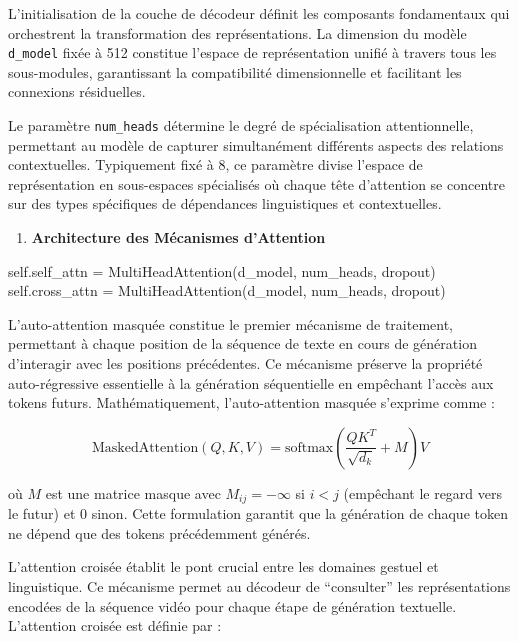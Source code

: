 \documentclass[12pt]{article}
\providecommand{\tightlist}{%
      \setlength{\itemsep}{0pt}\setlength{\parskip}{0pt}}
\newenvironment{Shaded}{}{}
\newcommand{\NormalTok}[1]{{#1}}
\newcommand{\VariableTok}[1]{\textcolor[rgb]{0.10,0.09,0.49}{{#1}}}
\newcommand{\OperatorTok}[1]{\textcolor[rgb]{0.40,0.40,0.40}{{#1}}}
\begin{document}
L'initialisation de la couche de décodeur définit les composants
fondamentaux qui orchestrent la transformation des représentations. La
dimension du modèle \texttt{d\_model} fixée à 512 constitue l'espace de
représentation unifié à travers tous les sous-modules, garantissant la
compatibilité dimensionnelle et facilitant les connexions résiduelles.

Le paramètre \texttt{num\_heads} détermine le degré de spécialisation
attentionnelle, permettant au modèle de capturer simultanément
différents aspects des relations contextuelles. Typiquement fixé à 8, ce
paramètre divise l'espace de représentation en sous-espaces spécialisés
où chaque tête d'attention se concentre sur des types spécifiques de
dépendances linguistiques et contextuelles.

\begin{enumerate}
\def\labelenumi{\arabic{enumi}.}
\setcounter{enumi}{1}
\tightlist
\item
  \textbf{Architecture des Mécanismes d'Attention}
\end{enumerate}

\begin{Shaded}
\begin{Highlighting}[]
\VariableTok{self}\NormalTok{.self\_attn }\OperatorTok{=}\NormalTok{ MultiHeadAttention(d\_model, num\_heads, dropout)}
\VariableTok{self}\NormalTok{.cross\_attn }\OperatorTok{=}\NormalTok{ MultiHeadAttention(d\_model, num\_heads, dropout)}
\end{Highlighting}
\end{Shaded}

L'auto-attention masquée constitue le premier mécanisme de traitement,
permettant à chaque position de la séquence de texte en cours de
génération d'interagir avec les positions précédentes. Ce mécanisme
préserve la propriété auto-régressive essentielle à la génération
séquentielle en empêchant l'accès aux tokens futurs. Mathématiquement,
l'auto-attention masquée s'exprime comme :

\[
\text{MaskedAttention}(Q, K, V) = \text{softmax}\left(\frac{QK^T}{\sqrt{d_k}} + M\right)V
\]

où \(M\) est une matrice masque avec \(M_{ij} = -\infty\) si \(i < j\)
(empêchant le regard vers le futur) et \(0\) sinon. Cette formulation
garantit que la génération de chaque token ne dépend que des tokens
précédemment générés.

L'attention croisée établit le pont crucial entre les domaines gestuel
et linguistique. Ce mécanisme permet au décodeur de ``consulter'' les
représentations encodées de la séquence vidéo pour chaque étape de
génération textuelle. L'attention croisée est définie par :
\end{document}
